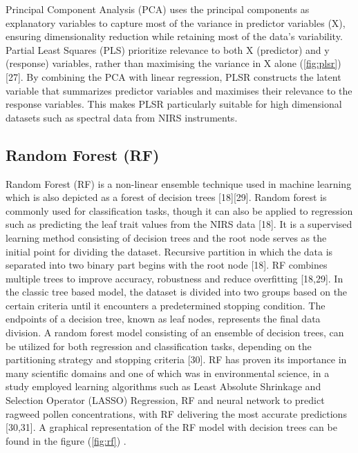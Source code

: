 \documentclass[12pt,a4paper]{report}
\begin{document}
Principal Component Analysis (PCA) uses the principal components as explanatory variables to capture most of the variance in predictor variables (X), ensuring dimensionality reduction while retaining most of the data’s variability. 
Partial Least Squares (PLS) prioritize relevance to both X (predictor) and y (response) variables, rather than maximising the variance in X alone (\ref{fig:plsr}) [27]. By combining the PCA with linear regression, PLSR constructs 
the latent variable that summarizes predictor variables and maximises their relevance to the response variables. This makes PLSR particularly suitable for high dimensional datasets such as spectral data from NIRS instruments. \\

\subsection{Random Forest (RF)}
Random Forest (RF) is a non-linear ensemble technique used in machine learning which is also depicted as a forest of decision trees [18][29]. Random forest is commonly used for classification tasks, though it can also be 
applied to regression such as predicting the leaf trait values from the NIRS data [18]. It is a supervised learning method consisting of decision trees and the root node serves as the initial point for dividing the dataset. 
Recursive partition in which the data is separated into two binary part begins with the root node [18]. RF combines multiple trees to improve accuracy, robustness and reduce overfitting [18,29].
In the classic tree based model, the dataset is divided into two groups based on the certain criteria until it encounters a predetermined stopping condition. The endpoints of a decision tree, known as leaf nodes, 
represents the final data division. A random forest model consisting of an ensemble of decision trees, can be utilized for both regression and classification tasks, depending on the partitioning strategy and stopping criteria [30]. 
RF has proven its importance in many scientific domains and one of which was in environmental science, in a study employed learning algorithms such as Least Absolute Shrinkage and Selection Operator (LASSO) Regression, RF and neural network to 
predict ragweed pollen concentrations, with RF delivering the most accurate predictions [30,31]. A graphical representation of the RF model with decision trees can be found in the figure (\ref{fig:rf}) . \\
\end{document}
